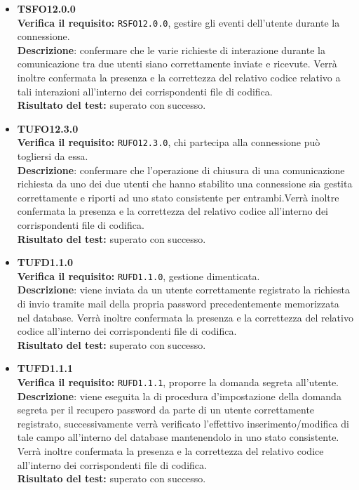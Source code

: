 \begin{itemize}
\item \textbf{TSFO12.0.0}\\
\textbf{Verifica il requisito:} \texttt{RSFO12.0.0}, gestire gli eventi dell'utente durante la connessione.\\
\textbf{Descrizione}: confermare che le varie richieste di interazione durante la comunicazione tra due utenti  siano correttamente inviate e ricevute. Verrà inoltre confermata la presenza e la correttezza del relativo codice relativo a tali interazioni all'interno dei corrispondenti file di codifica.\\
\textbf{Risultato del test:} superato con successo.

\item \textbf{TUFO12.3.0}\\
\textbf{Verifica il requisito:} \texttt{RUFO12.3.0}, chi partecipa alla connessione può togliersi da essa.\\
\textbf{Descrizione}: confermare che l'operazione di chiusura di una comunicazione richiesta da uno dei due utenti  che hanno stabilito una connessione sia gestita correttamente e riporti ad uno stato consistente per entrambi.Verrà inoltre confermata la presenza e la correttezza del relativo codice all'interno dei corrispondenti file di codifica.\\
\textbf{Risultato del test:} superato con successo.

\item \textbf{TUFD1.1.0}\\
\textbf{Verifica il requisito:} \texttt{RUFD1.1.0}, gestione  dimenticata.\\
\textbf{Descrizione}: viene inviata da un utente  correttamente registrato la richiesta di invio tramite mail della propria password precedentemente memorizzata nel database. Verrà inoltre confermata la presenza e la correttezza del relativo codice all'interno dei corrispondenti file di codifica.\\
\textbf{Risultato del test:} superato con successo.

\item \textbf{TUFD1.1.1}\\
\textbf{Verifica il requisito:} \texttt{RUFD1.1.1}, proporre la domanda segreta all'utente.\\
\textbf{Descrizione}: viene eseguita la  di procedura d'impostazione della domanda segreta per il recupero password da parte di un utente  correttamente registrato, successivamente verrà verificato l'effettivo inserimento/modifica di tale campo all'interno del database mantenendolo in uno stato consistente. Verrà inoltre confermata la presenza e la correttezza del relativo codice all'interno dei corrispondenti file di codifica.\\
\textbf{Risultato del test:} superato con successo.


\end{itemize}
